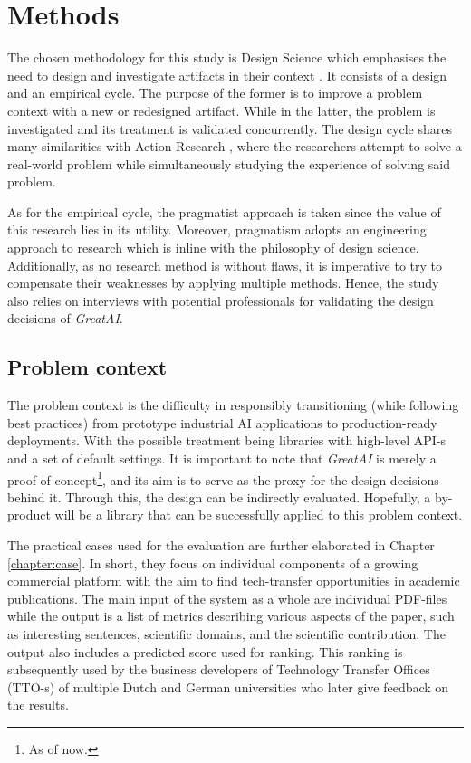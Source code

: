 \chapter{Methods} \label{chapter:methods}

The chosen methodology for this study is Design Science which emphasises the need to design and investigate artifacts in their context \cite{wieringa2014design}. It consists of a design and an empirical cycle. The purpose of the former is to improve a problem context with a new or redesigned artifact. While in the latter, the problem is investigated and its treatment is validated concurrently. The design cycle shares many similarities with Action Research \cite{davison2004principles}, where the researchers attempt to solve a real-world problem while simultaneously studying the experience of solving said problem. 

As for the empirical cycle, the pragmatist approach is taken since the value of this research lies in its utility. Moreover, pragmatism adopts an engineering approach to research \cite{shull2007guide} which is inline with the philosophy of design science. Additionally, as no research method is without flaws, it is imperative to try to compensate their weaknesses by applying multiple methods. Hence, the study also relies on interviews with potential professionals for validating the design decisions of \textit{GreatAI}.

\section{Problem context}

The problem context is the difficulty in responsibly transitioning (while following best practices) from prototype industrial AI applications to production-ready deployments. With the possible treatment being libraries with high-level API-s and a set of default settings. It is important to note that \textit{GreatAI} is merely a proof-of-concept\footnote{As of now.}, and its aim is to serve as the proxy for the design decisions behind it. Through this, the design can be indirectly evaluated. Hopefully, a by-product will be a library that can be successfully applied to this problem context.

The practical cases used for the evaluation are further elaborated in Chapter \ref{chapter:case}. In short, they focus on individual components of a growing commercial platform with the aim to find tech-transfer opportunities in academic publications. The main input of the system as a whole are individual PDF-files while the output is a list of metrics describing various aspects of the paper, such as interesting sentences, scientific domains, and the scientific contribution. The output also includes a predicted score used for ranking. This ranking is subsequently used by the business developers of Technology Transfer Offices (TTO-s) of multiple Dutch and German universities who later give feedback on the results.

